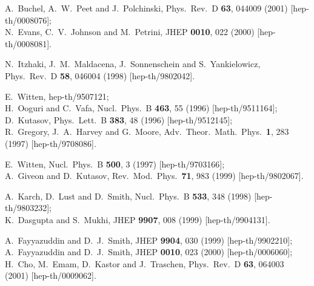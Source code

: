 \documentclass[a4paper,12pt]{article}
\renewcommand{\=}[1]{\bar{#1}}
\begin{document}
\begin{thebibliography}{10}
A.~Buchel, A.~W.~Peet and J.~Polchinski,
Phys.\ Rev.\ D {\bf 63}, 044009 (2001)
[hep-th/0008076];\\
N.~Evans, C.~V.~Johnson and M.~Petrini,
JHEP {\bf 0010}, 022 (2000)
[hep-th/0008081].

N.~Itzhaki, J.~M.~Maldacena, J.~Sonnenschein and S.~Yankielowicz,
Phys.\ Rev.\ D {\bf 58}, 046004 (1998)
[hep-th/9802042].

E.~Witten,
hep-th/9507121;\\
H.~Ooguri and C.~Vafa,
Nucl.\ Phys.\ B {\bf 463}, 55 (1996)
[hep-th/9511164];\\
D.~Kutasov,
Phys.\ Lett.\ B {\bf 383}, 48 (1996)
[hep-th/9512145];\\
R.~Gregory, J.~A.~Harvey and G.~Moore,
Adv.\ Theor.\ Math.\ Phys.\  {\bf 1}, 283 (1997)
[hep-th/9708086].

E.~Witten,
Nucl.\ Phys.\ B {\bf 500}, 3 (1997)
[hep-th/9703166];\\
A.~Giveon and D.~Kutasov,
Rev.\ Mod.\ Phys.\  {\bf 71}, 983 (1999)
[hep-th/9802067].

A.~Karch, D.~Lust and D.~Smith,
Nucl.\ Phys.\ B {\bf 533}, 348 (1998)
[hep-th/9803232];\\
K.~Dasgupta and S.~Mukhi,
JHEP {\bf 9907}, 008 (1999)
[hep-th/9904131].

A.~Fayyazuddin and D.~J.~Smith,
JHEP {\bf 9904}, 030 (1999)
[hep-th/9902210];\\
A.~Fayyazuddin and D.~J.~Smith,
JHEP {\bf 0010}, 023 (2000)
[hep-th/0006060];\\
H.~Cho, M.~Emam, D.~Kastor and J.~Traschen,
Phys.\ Rev.\ D {\bf 63}, 064003 (2001)
[hep-th/0009062].

\end{thebibliography}
\end{document}
